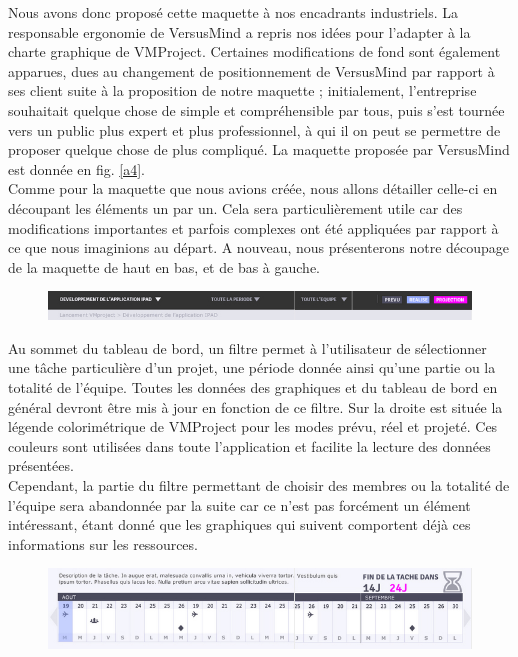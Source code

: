\documentclass[12pt]{report}
\begin{document}
Nous avons donc proposé cette maquette à nos encadrants industriels. La responsable ergonomie de VersusMind a repris nos idées pour l’adapter à la charte graphique de VMProject. Certaines modifications de fond sont également apparues, dues au changement de positionnement de VersusMind par rapport à ses client suite à la proposition de notre maquette ; initialement, l’entreprise souhaitait quelque chose de simple et compréhensible par tous, puis s’est tournée vers un public plus expert et plus professionnel, à qui il on peut se permettre de proposer quelque chose de plus compliqué. La maquette proposée par VersusMind est donnée en fig. \ref{a4}.\\

Comme pour la maquette que nous avions créée, nous allons détailler celle-ci en découpant les éléments un par un. Cela sera particulièrement utile car des modifications importantes et parfois complexes ont été appliquées par rapport à ce que nous imaginions au départ. A nouveau, nous présenterons notre découpage de la maquette de haut en bas, et de bas à gauche.\\

\begin{figure}[H]
	\centering
	\includegraphics[width=1\textwidth]{pictures/maquetteVersusmind/filtre.jpg}
	\caption{}
	\label{12}
\end{figure}

Au sommet du tableau de bord, un filtre permet à l'utilisateur de sélectionner une tâche particulière d'un projet, une période donnée ainsi qu'une partie ou la totalité de l'équipe. Toutes les données des graphiques et du tableau de bord en général devront être mis à jour en fonction de ce filtre. 
Sur la droite est située la légende colorimétrique de VMProject pour les modes prévu, réel et projeté. Ces couleurs sont utilisées dans toute l'application et facilite la lecture des données présentées.\\

Cependant, la partie du filtre permettant de choisir des membres ou la totalité de l'équipe sera abandonnée par la suite car ce n'est pas forcément un élément intéressant, étant donné que les graphiques qui suivent comportent déjà ces informations sur les ressources. \\

\begin{figure}[H]
	\centering
	\includegraphics[width=1\textwidth]{pictures/maquetteVersusmind/descriptioncalendrier.jpg}
	\caption{}
	\label{13}
\end{figure}
\end{document}
